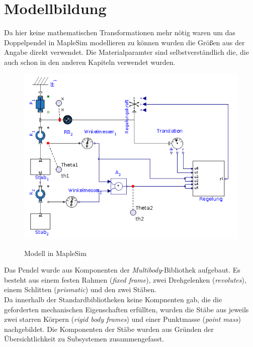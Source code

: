\documentclass[a4paper, 10pt]{report}
\begin{document}
\section{Modellbildung}
Da hier keine mathematischen Transformationen mehr nötig waren um das Doppelpendel in MapleSim modellieren zu können wurden die Größen aus der Angabe direkt verwendet. Die Materialparamter sind selbstverständlich die, die auch schon in den anderen Kapiteln verwendet wurden. \\
\begin{figure}[h]
\centering  %
\label{MapleSimModell}
{\includegraphics[width=\textwidth]{MapleSimModel}}
\caption{Modell in MapleSim}
\end{figure}
\newpage \noindent
Das Pendel wurde aus Komponenten der \textit{Multibody}-Bibliothek aufgebaut. Es besteht aus einem festen Rahmen (\textit{fixed frame}), zwei Drehgelenken (\textit{revolutes}), einem Schlitten (\textit{prismatic}) und den zwei Stäben. \\
Da innerhalb der Standardbibliotheken keine Kompnenten gab, die die geforderten mechanischen Eigenschaften erfüllten, wurden die Stäbe aus jeweils zwei starren Körpern (\textit{rigid body frames}) und einer Punktmasse (\textit{point mass}) nachgebildet. Die Komponenten der Stäbe wurden aus Gründen der Übersichtlichkeit zu Subsystemen zusammengefasst.
\\\\
\end{document}
